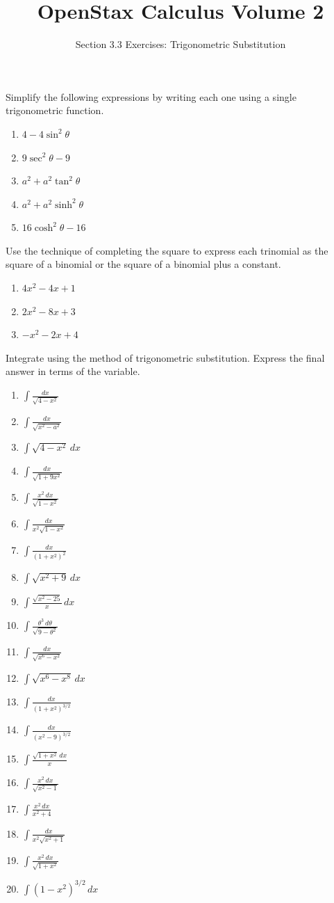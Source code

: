 \documentclass{exercises}
\title{OpenStax Calculus Volume 2}
\subtitle{Section 3.3 Exercises: Trigonometric Substitution}
\author{}
\date{}
\begin{document}
\maketitle


Simplify the following expressions by writing each one using a single trigonometric function.

\begin{enumerate}[start=1]
\item $4-4\sin^{2}\theta$
\item $9\sec^{2}\theta-9$
\item $a^{2}+a^{2}\tan^{2}\theta$
\item $a^{2}+a^{2}\sinh^{2}\theta$
\item $16\cosh^{2}\theta-16$
\end{enumerate}

Use the technique of completing the square to express each trinomial as the square of a binomial or the square of a binomial plus a constant.

\begin{enumerate}[resume]
\item $4x^{2}-4x+1$
\item $2x^{2}-8x+3$
\item $-x^{2}-2x+4$
\end{enumerate}

Integrate using the method of trigonometric substitution. Express the final answer in terms of the variable.

\begin{enumerate}[resume]
\item $\int \frac{dx}{\sqrt{4-x^{2}}}$
\item $\int \frac{dx}{\sqrt{x^{2}-a^{2}}}$
\item $\int \sqrt{4-x^{2}}\,dx$
\item $\int \frac{dx}{\sqrt{1+9x^{2}}}$
\item $\int \frac{x^{2}\,dx}{\sqrt{1-x^{2}}}$
\item $\int \frac{dx}{x^{2}\sqrt{1-x^{2}}}$
\item $\int \frac{dx}{{(1+x^{2})}^{2}}$
\item $\int \sqrt{x^{2}+9}\,dx$
\item $\int \frac{\sqrt{x^{2}-25}}{x}\,dx$
\item $\int \frac{\theta^{3}\,d\theta}{\sqrt{9-\theta^{2}}}$
\item $\int \frac{dx}{\sqrt{x^{6}-x^{2}}}$
\item $\int \sqrt{x^{6}-x^{8}}\,dx$
\item $\int \frac{dx}{{(1+x^{2})}^{3/2}}$
\item $\int \frac{dx}{{(x^{2}-9)}^{3/2}}$
\item $\int \frac{\sqrt{1+x^{2}}\,dx}{x}$
\item $\int \frac{x^{2}\,dx}{\sqrt{x^{2}-1}}$
\item $\int \frac{x^{2}\,dx}{x^{2}+4}$
\item $\int \frac{dx}{x^{2}\sqrt{x^{2}+1}}$
\item $\int \frac{x^{2}\,dx}{\sqrt{1+x^{2}}}$
\item $\int (1-x^{2})^{3/2}\,dx$
\end{enumerate}
\end{document}

